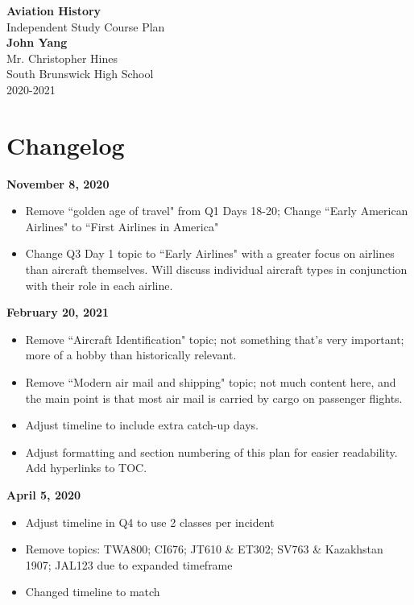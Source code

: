 \documentclass[12pt]{article}
\begin{document}
	\begin{titlepage}
		\begin{center}
			\vspace*{1cm}
			\Huge
				\textbf{Aviation History}\\
			\vspace{0.5cm}
			\LARGE
				Independent Study Course Plan\\
			\vspace{1.5cm}
				\textbf{John Yang}\\
			\vfill
			\vspace{0.8cm}
			\Large
				Mr. Christopher Hines\\
				South Brunswick High School\\
				2020-2021
		\end{center}
	\end{titlepage}\newpage

\section{Changelog}
\textbf{November 8, 2020}
\begin{itemize}
    \item Remove ``golden age of travel" from Q1 Days 18-20; Change ``Early American Airlines"
    to ``First Airlines in America"
    \item Change Q3 Day 1 topic to ``Early Airlines" with a greater focus on airlines than aircraft
    themselves. Will discuss individual aircraft types in conjunction with their role in each
    airline.
\end{itemize}
\textbf{February 20, 2021}
\begin{itemize}
    \item Remove ``Aircraft Identification" topic; not something that's very important; more of a hobby than historically relevant. 
    \item Remove ``Modern air mail and shipping" topic; not much content here, and the main point is that most air mail is carried by cargo on passenger flights. 
    \item Adjust timeline to include extra catch-up days. 
    \item Adjust formatting and section numbering of this plan for easier readability. Add hyperlinks to TOC. 
\end{itemize}
\textbf{April 5, 2020}
\begin{itemize}
    \item Adjust timeline in Q4 to use 2 classes per incident
    \item Remove topics: TWA800; CI676; JT610 & ET302; SV763 & Kazakhstan 1907; JAL123 due to expanded timeframe
    \item Changed timeline to match
\end{itemize}
\end{document}

